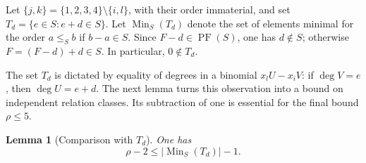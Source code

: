 \documentclass[10pt]{amsart}
\theoremstyle{plain}
\newtheorem{lemma}{Lemma}[section]
\begin{document}
Let \(\{j,k\}=\{1,2,3,4\}\setminus\{i,l\}\), with their order
immaterial, and set \(T_d=\{e\in S:e+d\in S\}\).
Let \(\operatorname{Min}_S(T_d)\) denote the set of elements minimal for
the order \(a\le_S b\) if \(b-a\in S\).  Since
\(F-d\in\operatorname{PF}(S)\), one has \(d\notin S\); otherwise
\(F=(F-d)+d\in S\).  In particular, \(0\notin T_d\).

The set \(T_d\) is dictated by equality of degrees in a binomial
\(x_lU-x_iV\): if \(\deg V=e\), then \(\deg U=e+d\).
The next lemma turns this observation into a bound on independent
relation classes.  Its subtraction of one is essential for the final
bound \(\rho\le5\).

\begin{lemma}[Comparison with \(T_d\)]\label{lem:type2-comparison}
One has
\[
\rho-2\le |\operatorname{Min}_S(T_d)|-1.
\]
\end{lemma}
\end{document}
